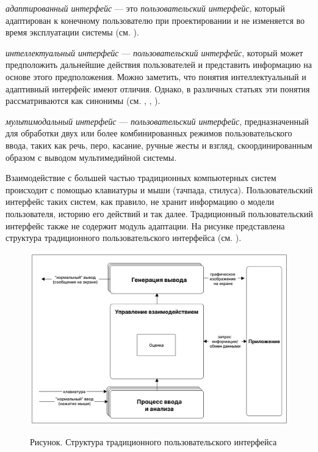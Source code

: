 \textit{адаптированный интерфейс} --- это \textit{пользовательский интерфейс}, который адаптирован к конечному пользователю при проектировании и не изменяется во время эксплуатации системы (см. ).

\textit{интеллектуальный интерфейс} --- \textit{пользовательский интерфейс}, который может предположить дальнейшие действия пользователей и представить информацию на основе этого предположения. Можно заметить, что понятия интеллектуальный и адаптивный интерфейс имеют отличия. Однако, в различных статьях эти понятия рассматриваются как синонимы (см. , , ).

\textit{мультимодальный интерфейс} --- \textit{пользовательский интерфейс}, предназначенный для обработки двух или более комбинированных режимов пользовательского ввода, таких как речь, перо, касание, ручные жесты и взгляд, скоординированным образом с выводом мультимедийной системы.

Взаимодействие с большей частью традиционных компьютерных систем происходит с помощью клавиатуры и мыши (тачпада, стилуса). Пользовательский интерфейс таких систем, как правило, не хранит информацию о модели пользователя, историю его действий и так далее. Традиционный пользовательский интерфейс также не содержит модуль адаптации. На рисунке \textit{} представлена структура традиционного пользовательского интерфейса (см. ).

\begin{figure}[H]
	\caption{Рисунок. Структура традиционного пользовательского интерфейса}
	\includegraphics[scale=0.4]{author/part4/figures/traditional_ui.png}
	\label{fig:traditional_ui}
\end{figure}

